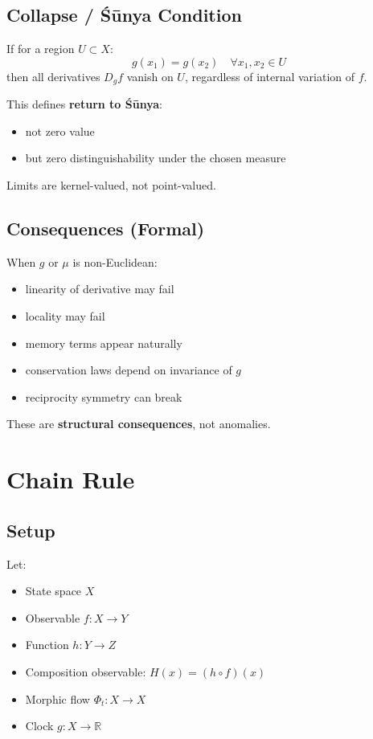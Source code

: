 \documentclass[12pt, oneside]{article}
\begin{document}
\subsection{Collapse / Śūnya Condition}

If for a region $U \subset X$:
\begin{equation}
g(x_1) = g(x_2) \quad \forall x_1, x_2 \in U
\end{equation}
then all derivatives $D_g f$ vanish on $U$, regardless of internal variation of $f$.

This defines \textbf{return to Śūnya}:
\begin{itemize}
    \item not zero value
    \item but zero distinguishability under the chosen measure
\end{itemize}
Limits are kernel-valued, not point-valued.

\subsection{Consequences (Formal)}

When $g$ or $\mu$ is non-Euclidean:
\begin{itemize}
    \item linearity of derivative may fail
    \item locality may fail
    \item memory terms appear naturally
    \item conservation laws depend on invariance of $g$
    \item reciprocity symmetry can break
\end{itemize}
These are \textbf{structural consequences}, not anomalies.

\section{Chain Rule}

\subsection{Setup}

Let:
\begin{itemize}
    \item State space $X$
    \item Observable $f: X \rightarrow Y$
    \item Function $h: Y \rightarrow Z$
    \item Composition observable: $H(x) = (h \circ f)(x)$
    \item Morphic flow $\Phi_t: X \rightarrow X$
    \item Clock $g: X \rightarrow \mathbb{R}$
\end{itemize}
\end{document}
